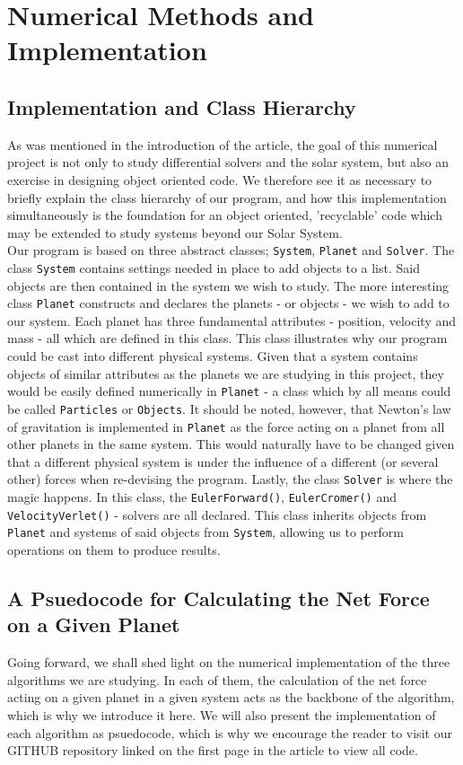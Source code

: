\section{Numerical Methods and Implementation}
	\subsection{Implementation and Class Hierarchy}
	
	As was mentioned in the introduction of the article, the goal of this numerical project is not only to study differential solvers and the solar system, but also an exercise in designing object oriented code. We therefore see it as necessary to briefly explain the class hierarchy of our program, and how this implementation simultaneously is the foundation for an object oriented, 'recyclable' code which may be extended to study systems beyond our Solar System.\\
	
	Our program is based on three abstract classes; \texttt{System}, \texttt{Planet} and \texttt{Solver}. The class \texttt{System} contains settings needed in place to add objects to a list. Said objects are then contained in the system we wish to study. The more interesting class \texttt{Planet} constructs and declares the planets - or objects - we wish to add to our system. Each planet has three fundamental attributes - position, velocity and mass - all which are defined in this class. This class illustrates why our program could be cast into different physical systems. Given that a system contains objects of similar attributes as the planets we are studying in this project, they would be easily defined numerically in \texttt{Planet} - a class which by all means could be called \texttt{Particles} or \texttt{Objects}. It should be noted, however, that Newton's law of gravitation is implemented in \texttt{Planet} as the force acting on a planet from all other planets in the same system. This would naturally have to be changed given that a different physical system is under the influence of a different (or several other) forces when re-devising the program. Lastly, the class \texttt{Solver} is where the magic happens. In this class, the \texttt{EulerForward()}, \texttt{EulerCromer()} and \texttt{VelocityVerlet()} - solvers are all declared. This class inherits objects from \texttt{Planet} and systems of said objects from \texttt{System}, allowing us to perform operations on them to produce results.
	\subsection{A Psuedocode for Calculating the Net Force on a Given Planet}
	Going forward, we shall shed light on the numerical implementation of the three algorithms we are studying. In each of them, the calculation of the net force acting on a given planet in a given system acts as the backbone of the algorithm, which is why we introduce it here. We will also present the implementation of each algorithm as psuedocode, which is why we encourage the reader to visit our GITHUB repository linked on the first page in the article to view all code. 
	
